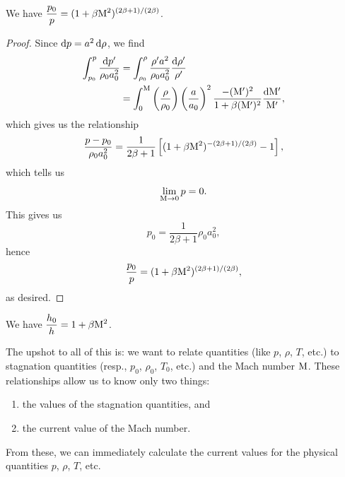 \begin{proposition}
We have $\displaystyle{\frac{p_{0}}{p}=(1+\beta\mathrm{M}^{2})^{(2\beta+1)/(2\beta)}}$.
\end{proposition}

\begin{proof}
Since $\mathrm{d} p = a^{2}\,\mathrm{d}\rho$, we find
\begin{subequations}
  \begin{align}
\int^{p}_{p_{0}}\frac{\mathrm{d} p'}{\rho_{0}a_{0}^{2}}
&=\int^{\rho}_{\rho_{0}}\frac{\rho'a^{2}}{\rho_{0}a_{0}^{2}}\frac{\mathrm{d}\rho'}{\rho'}\\
&=\int^{\mathrm{M}}_{0}\left(\frac{\rho}{\rho_{0}}\right)
\left(\frac{a}{a_{0}}\right)^{2}
\frac{-(\mathrm{M}')^{2}}{1+\beta(\mathrm{M}')^{2}}
\frac{\mathrm{d}\mathrm{M}'}{\mathrm{M}'},
  \end{align}
\end{subequations}
which gives us the relationship
\begin{equation}
\frac{p-p_{0}}{\rho_{0}a_{0}^{2}} 
= \frac{1}{2\beta+1}\left[(1+\beta\mathrm{M}^{2})^{-(2\beta+1)/(2\beta)}-1\right],
\end{equation}
which tells us
\begin{equation}
\lim_{\mathrm{M}\to0}p=0.
\end{equation}
This gives us
\begin{equation}
p_{0}=\frac{1}{2\beta+1}\rho_{0}a_{0}^{2},
\end{equation}
hence
\begin{equation}
\frac{p_{0}}{p}=(1+\beta\mathrm{M}^{2})^{(2\beta+1)/(2\beta)},
\end{equation}
as desired.
\end{proof}

\begin{proposition}
We have $\displaystyle{\frac{h_{0}}{h}=1+\beta\mathrm{M}^{2}}$.
\end{proposition}

\begin{node}
The upshot to all of this is: we want to relate quantities (like $p$,
$\rho$, $T$, etc.) to stagnation quantities (resp., $p_{0}$,
$\rho_{0}$, $T_{0}$, etc.) and the Mach number $\mathrm{M}$. These
relationships allow us to know only two things:
\begin{enumerate}
\item the values of the stagnation quantities, and
\item the current value of the Mach number.
\end{enumerate}
From these, we can immediately calculate the current values for the
physical quantities $p$, $\rho$, $T$, etc.
\end{node}


